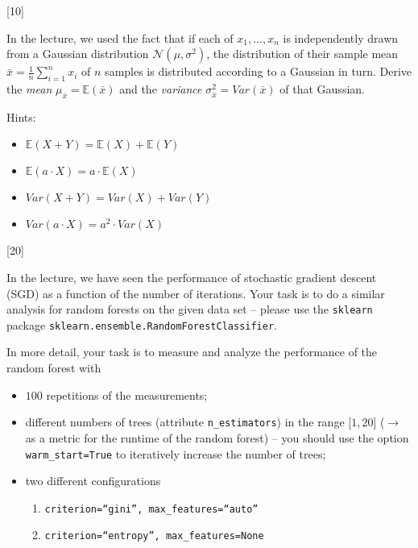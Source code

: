 \documentclass{exam}
\newcommand{\hide}[1]{#1}
\renewcommand{\hide}[1]{}
\begin{document}
\begin{questions}


[10]

In the lecture, we used the fact that if each of $x_1, \dots, x_n$ is independently drawn from a Gaussian distribution $\mathcal{N}(\mu,\sigma^2)$, the distribution of their sample mean $\bar{x} = \frac{1}{n} \sum_{i=1}^{n} x_i$ of $n$ samples is distributed according to a Gaussian in turn. 
Derive the \emph{mean} $\mu_{\bar{x}} = \mathds{E}(\bar{x})$ and the \emph{variance} $\sigma^2_{\bar{x}} = Var(\bar{x})$ of that Gaussian.

\noindent
Hints:
\begin{itemize}
	\item $\mathds{E}(X+Y) = \mathds{E}(X) + \mathds{E}(Y)$
	\item $\mathds{E}(a \cdot X) = a \cdot \mathds{E}(X)$
	\item $Var(X+Y) = Var(X) + Var(Y)$
	\item $Var(a\cdot X) = a^2 \cdot Var(X)$
\end{itemize}

\hide{
Solution:\\
$\mathds{E}(\bar{x}) = \frac{1}{n} \sum_{i=1}^n \mathds{E}(x_i) = \frac{1}{n} \cdot n \cdot \mu = \mu$\\
$\to \mu_{\bar{x}} = \mu$\\

$Var(\bar{x}) = Var(\frac{1}{n} \sum_{i=1}^{n} x_i) = \frac{1}{n^2} Var(\sum_{i=1}^{n} x_i) = \frac{1}{n^2} \sum_{i=1}^{n} Var(x_i) = \frac{1}{n^2} \sum_{i=1}^{n} \sigma^2 = \frac{\sigma^2}{n} $\\
$\to \sigma^2_{\bar{x}} = \frac{\sigma^2}{n}$
}

[20]

In the lecture, we have seen the performance of stochastic gradient descent (SGD) as a function of the number of iterations.
Your task is to do a similar analysis for random forests on the given data set -- please use the \texttt{sklearn} package \texttt{sklearn.ensemble.RandomForestClassifier}.

In more detail, your task is to measure and analyze the performance of the random forest with

\begin{itemize}
  \item $100$ repetitions of the measurements;
  \item different numbers of trees (attribute \texttt{n\_estimators}) in the range [$1,20$] ($\to$ as a metric for the runtime of the random forest) -- you should use the option \texttt{warm\_start=True} to iteratively increase the number of trees;
  \item two different configurations
  \begin{enumerate}
    \item \texttt{criterion=``gini'', max\_features=``auto''}
    \item \texttt{criterion=``entropy'', max\_features=None}
  \end{enumerate}
\end{itemize} 


\end{questions}
\end{document}
